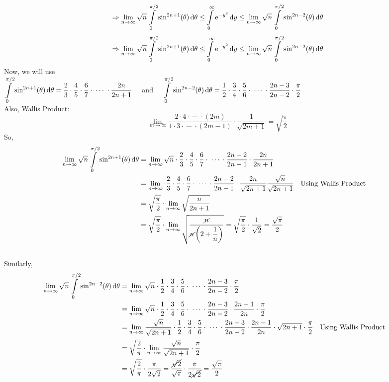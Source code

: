 \documentclass[14]{article}
\theoremstyle{definition}
\theoremstyle{case}
\begin{document}
\[\Rightarrow \lim\limits_{n \to \infty} \sqrt{n}\int\limits_0^{\pi/2} \sin^{2n+1}(\theta) \dif \theta \leq \int\limits_0^{\infty} {\rm e}^{-y^2} \dif y \leq \lim\limits_{n \to \infty} \sqrt{n} \int\limits_0^{\pi/2} \sin^{2n-2}(\theta) \dif \theta \]
\pagebreak
\[\Rightarrow \lim\limits_{n \to \infty} \sqrt{n}\int\limits_0^{\pi/2} \sin^{2n+1}(\theta) \dif \theta \leq \int\limits_0^{\infty} {\rm e}^{-y^2} \dif y \leq \lim\limits_{n \to \infty} \sqrt{n} \int\limits_0^{\pi/2} \sin^{2n-2}(\theta) \dif \theta \]
Now, we will use\\
$\displaystyle\int\limits_0^{\pi/2} \sin^{2n+1}(\theta) \dif \theta = \dfrac23 \cdot \dfrac45 \cdot \dfrac67\cdot \; \cdots \; \cdot \dfrac{2n}{2n+1} \quad$ and $\quad\displaystyle\int\limits_0^{\pi/2} \sin^{2n-2}(\theta) \dif \theta = \dfrac12 \cdot \dfrac34 \cdot \dfrac56 \cdot \; \cdots \; \cdot \dfrac{2n-3}{2n-2} \cdot \dfrac{\pi}{2}$\\
Also, Wallis Product:
\[\lim\limits_{m \to \infty} \dfrac{2 \cdot 4  \cdot \; \cdots \; \cdot (2m)}{1 \cdot 3 \cdot\; \cdots \; \cdot (2m-1)} \cdot \dfrac1{\sqrt{2m+1}} = \sqrt{\dfrac{\pi}{2}}\]
So,
\begin{align*}
\lim\limits_{n \to \infty} \sqrt{n}\int\limits_0^{\pi/2} \sin^{2n+1}(\theta) \dif \theta &=\lim\limits_{n \to \infty} \sqrt{n} \cdot \dfrac23 \cdot \dfrac45 \cdot \dfrac67\cdot \; \cdots \; \cdot \dfrac{2n-2}{2n-1} \cdot \dfrac{2n}{2n+1}\\
&=\lim\limits_{n \to \infty} \cdot \dfrac23 \cdot \dfrac45 \cdot \dfrac67\cdot \; \cdots \; \cdot \dfrac{2n-2}{2n-1} \cdot \dfrac{2n}{\sqrt{2n+1}} \dfrac{\sqrt{n}}{\sqrt{2n+1}} && \text{Using Wallis Product}\\
&= \sqrt{\dfrac{\pi}{2}} \cdot \lim\limits_{n \to \infty} \sqrt{\dfrac{n}{2n+1}}\\
&= \sqrt{\dfrac{\pi}{2}} \cdot \lim\limits_{n \to \infty}\sqrt{\dfrac{\cancel{n}}{\cancel{n}\left(2 + \dfrac1n\right)}} = \sqrt{\dfrac{\pi}{2}} \cdot \dfrac1{\sqrt2} = \dfrac{\sqrt{\pi}}2
\end{align*}\\
Similarly,
\begin{align*}
\lim\limits_{n \to \infty} \sqrt{n}\int\limits_0^{\pi/2} \sin^{2n-2}(\theta) \dif \theta &= \lim\limits_{n \to \infty} \sqrt{n} \cdot \dfrac12 \cdot \dfrac34 \cdot \dfrac56 \cdot \; \cdots \; \cdot \dfrac{2n-3}{2n-2} \cdot \dfrac{\pi}{2}\\
&= \lim\limits_{n \to \infty} \sqrt{n} \cdot \dfrac12 \cdot \dfrac34 \cdot \dfrac56 \cdot \; \cdots \; \cdot \dfrac{2n-3}{2n-2} \cdot \dfrac{2n-1}{2n} \cdot \dfrac{\pi}{2}\\
&= \lim\limits_{n \to \infty} \dfrac{\sqrt{n}}{\sqrt{2n+1}} \cdot \dfrac12 \cdot \dfrac34 \cdot \dfrac56 \cdot \; \cdots \; \cdot \dfrac{2n-3}{2n-2} \cdot \dfrac{2n-1}{2n} \cdot  \sqrt{2n+1} \cdot \dfrac{\pi}{2} && \text{Using Wallis Product}\\
&= \sqrt{\dfrac2{\pi}} \cdot\lim\limits_{n \to \infty} \dfrac{\sqrt{n}}{\sqrt{2n+1}} \cdot \dfrac{\pi}{2}\\
&= \sqrt{\dfrac2{\pi}} \cdot \dfrac{\pi}{2\sqrt2} = \dfrac{\cancel{\sqrt{2}}}{\sqrt{\pi}} \cdot \dfrac{\pi}{2\cancel{\sqrt2}} = \dfrac{\sqrt{\pi}}2
\end{align*}
\end{document}
